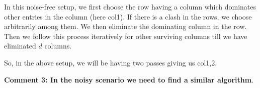 \documentclass[twoside]{article}
\begin{document}
In this noise-free setup, we first choose the row having a column which dominates other entries in the column (here col{1}). If there is a clash  in the rows, we choose arbitrarily among them. We then eliminate the dominating column in the row. Then we follow this process iteratively for other surviving columns till we have eliminated $d$ columns. 

So, in the above setup, we will be having two passes giving us col{1,2}.

\textbf{Comment 3: In the noisy scenario we need to find a similar algorithm}.





%


\end{document}
